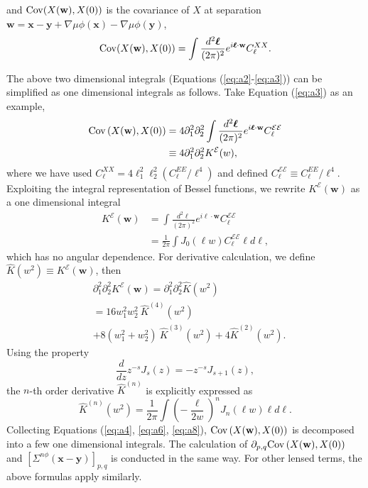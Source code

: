 \documentclass[aps, prd, reprint, nofootinbib, groupedaddress, showpacs]{revtex4-1}
\def\be{\begin{equation}}
\def\ee{\end{equation}}
\def\mE{\mathcal E}
\newcommand*\Bell{\ensuremath{\boldsymbol\ell}}
\begin{document}
and ${\rm Cov}(X(\mathbf w), X(0))$ is the covariance of $X$
at separation $\mathbf w =\mathbf x-\mathbf y + \nabla\mu\phi(\mathbf x)-\nabla\mu\phi(\mathbf y)$,
\be
\label{eq:a3}
    {\rm Cov}(X(\mathbf w), X(0)) = \int \frac{d^2\Bell}{(2\pi)^2} e^{i \Bell\cdot \mathbf w} C_\ell^{XX}.
\ee


The above two dimensional integrals (Equations (\ref{eq:a2}-\ref{eq:a3})) can be simplified as  one dimensional integrals
as follows. Take Equation (\ref{eq:a3}) as an example,
\be
\label{eq:a4}
\begin{aligned}
{\rm Cov}\left( X(\mathbf w), X(0) \right)
& = 4\partial_1^2\partial_2^2 \int \frac{d^2\Bell}{(2\pi)^2} e^{i\Bell\cdot \mathbf w} C_\ell^{\mE\mE}\\
&\equiv 4\partial_1^2\partial_2^2 K^{\mathcal E}(w),
\end{aligned}
\ee
where we have used $C_\ell^{XX} = 4\ell_1^2 \ell_2^2 (C_\ell^{EE}/\ell^4)$
and defined $C_\ell^{\mE\mE} \equiv C_\ell^{EE}/\ell^4 $.
Exploiting the integral representation of Bessel functions, we rewrite $K^{\mathcal E}(\mathbf w)$ as a one dimensional
integral
\be
\begin{aligned}
K^{\mathcal E}(\mathbf w)
&=\int \frac{d^2\Bell}{(2\pi)^2} e^{i\Bell\cdot \mathbf w} C_\ell^{\mE\mE} \\
&=\frac{1}{2\pi}\int  J_0\left(\ell w \right)  C_\ell^{\mE\mE} \ell d\ell,
\end{aligned}
\ee
which has no angular dependence.
For derivative calculation, we define $\hat K(w^2) \equiv K^{\mathcal E}(\mathbf w)$,
then
\be
\label{eq:a6}
\begin{aligned}
&\partial_1^2 \partial_2^2 K^{\mathcal E}(\mathbf w)
=\partial_1^2 \partial_2^2 \hat K (w^2) \\
&= 16w_1^2w_2^2 \ \hat K^{(4)}(w^2)  \\
& + 8(w_1^2 + w_2^2) \ \hat K^{(3)}(w^2)  + 4\hat K^{(2)}(w^2).
\end{aligned}
\ee
Using the property
\be
\frac{d}{dz} z^{-s} J_s(z) = - z^{-s} J_{s+1}(z),
\ee
the $n$-th order derivative $\hat K^{(n)}$ is explicitly expressed as
\be
\label{eq:a8}
\hat K^{(n)}(w^2)
= \frac{1}{2\pi} \int \left(-\frac{\ell}{2w} \right)^n  J_n(\ell w) \ell d\ell.
\ee
Collecting Equations (\ref{eq:a4}, \ref{eq:a6}, \ref{eq:a8}),  ${\rm Cov}\left( X(\mathbf w), X(0) \right)$
is decomposed into a few one dimensional integrals.
The calculation of $\partial_{p,q}{\rm Cov}\left( X(\mathbf w), X(0) \right)$ and
$\left[\Sigma^{n\phi}(\mathbf x-\mathbf y)\right]_{p,q}$ is conducted in the same way.
For other lensed terms, the above formulas apply similarly.
\end{document}

